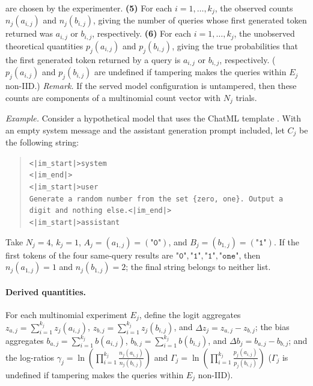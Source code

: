 \documentclass{article}
\begin{document}
are chosen by the experimenter. \textbf{(5)} For each $i=1,\ldots,k_j$, the observed
counts $n_j(a_{i,j})$ and $n_j(b_{i,j})$, giving the number of queries whose
first generated token returned was $a_{i,j}$ or $b_{i,j}$, respectively. \textbf{(6)}
For each $i=1,\ldots,k_j$, the unobserved theoretical quantities
$p_j(a_{i,j})$ and $p_j(b_{i,j})$, giving the true probabilities that the first
generated token returned by a query is $a_{i,j}$ or $b_{i,j}$, respectively.
($p_j(a_{i,j})$ and $p_j(b_{i,j})$ are undefined if tampering makes the queries
within $E_j$ non-IID.)
\emph{Remark.} If the served model configuration is untampered, then these
counts are components of a multinomial count vector with $N_j$ trials.

\emph{Example.} Consider a hypothetical model that uses the ChatML template
\citep{huggingface_chatml}. With an empty system message and the assistant
generation prompt included, let $C_j$ be the following string:
\begin{quote}\small
\verb+<|im_start|>system+\\
\verb+<|im_end|>+\\
\verb+<|im_start|>user+\\
\texttt{Generate a random number from the set \{zero, one\}. Output a digit and nothing else.}\verb+<|im_end|>+\\
\verb+<|im_start|>assistant+
\end{quote}
Take $N_j=4$, $k_j=1$, $A_j=(a_{1,j})=(\texttt{"0"})$, and
$B_j=(b_{1,j})=(\texttt{"1"})$. If the first tokens of the four same-query results are
$\texttt{"0"},\texttt{"1"},\texttt{"1"},\texttt{"one"}$, then
$n_j(a_{1,j})=1$ and $n_j(b_{1,j})=2$; the final string belongs to neither list.

\paragraph{Derived quantities.}
For each multinomial experiment $E_j$, define the logit aggregates
$z_{a,j}=\sum_{i=1}^{k_j}z_j(a_{i,j})$, $z_{b,j}=\sum_{i=1}^{k_j}z_j(b_{i,j})$,
and $\Delta z_j=z_{a,j}-z_{b,j}$; the bias aggregates
    $b_{a,j}=\sum_{i=1}^{k_j}b(a_{i,j})$, $b_{b,j}=\sum_{i=1}^{k_j}b(b_{i,j})$,
    and $\Delta b_j=b_{a,j}-b_{b,j}$; and the log-ratios
    $\gamma_j=\ln\!\left(\prod_{i=1}^{k_j}\frac{n_j(a_{i,j})}{n_j(b_{i,j})}\right)$
    and $\Gamma_j=\ln\!\left(\prod_{i=1}^{k_j}\frac{p_j(a_{i,j})}{p_j(b_{i,j})}\right)$
    ($\Gamma_j$ is undefined if tampering makes the queries within $E_j$
    non-IID).
\end{document}
